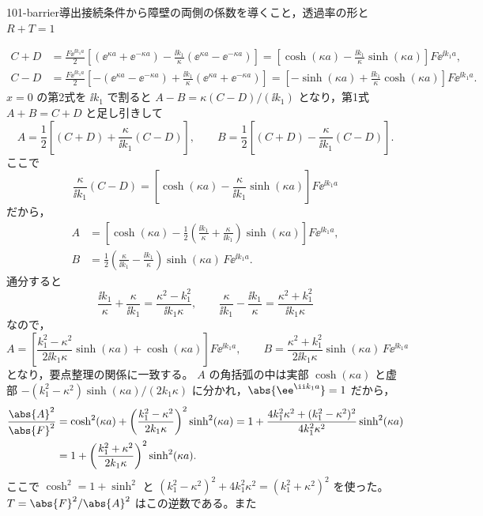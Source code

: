 \documentclass[uplatex,dvipdfmx,a4paper,11pt]{jsarticle}
\begin{document}
\begin{mondai}{101-barrier}{導出}{接続条件から障壁の両側の係数を導くこと，透過率の形と $R+T=1$}
\begin{tadashii}
\begin{align*}
  C+D&=\frac{F\ee^{\ii k_{1}a}}{2}\left[(\ee^{\kappa a}+\ee^{-\kappa a})-\frac{\ii k_{1}}{\kappa}(\ee^{\kappa a}-\ee^{-\kappa a})\right]
     =\left[\cosh(\kappa a)-\frac{\ii k_{1}}{\kappa}\sinh(\kappa a)\right]F\ee^{\ii k_{1}a},\\
  C-D&=\frac{F\ee^{\ii k_{1}a}}{2}\left[-(\ee^{\kappa a}-\ee^{-\kappa a})+\frac{\ii k_{1}}{\kappa}(\ee^{\kappa a}+\ee^{-\kappa a})\right]
     =\left[-\sinh(\kappa a)+\frac{\ii k_{1}}{\kappa}\cosh(\kappa a)\right]F\ee^{\ii k_{1}a} .
\end{align*}
$x=0$ の第2式を $\ii k_{1}$ で割ると $A-B=\kappa(C-D)/(\ii k_{1})$ となり，第1式 $A+B=C+D$ と足し引きして
\[ A=\frac{1}{2}\left[(C+D)+\frac{\kappa}{\ii k_{1}}(C-D)\right],\qquad B=\frac{1}{2}\left[(C+D)-\frac{\kappa}{\ii k_{1}}(C-D)\right] . \]
ここで
\[ \frac{\kappa}{\ii k_{1}}(C-D)=\left[\cosh(\kappa a)-\frac{\kappa}{\ii k_{1}}\sinh(\kappa a)\right]F\ee^{\ii k_{1}a} \]
だから，
\begin{align*}
  A&=\left[\cosh(\kappa a)-\frac{1}{2}\left(\frac{\ii k_{1}}{\kappa}+\frac{\kappa}{\ii k_{1}}\right)\sinh(\kappa a)\right]F\ee^{\ii k_{1}a},\\
  B&=\frac{1}{2}\left(\frac{\kappa}{\ii k_{1}}-\frac{\ii k_{1}}{\kappa}\right)\sinh(\kappa a)\,F\ee^{\ii k_{1}a} .
\end{align*}
通分すると
\[ \frac{\ii k_{1}}{\kappa}+\frac{\kappa}{\ii k_{1}}=\frac{\kappa^{2}-k_{1}^{2}}{\ii k_{1}\kappa},\qquad \frac{\kappa}{\ii k_{1}}-\frac{\ii k_{1}}{\kappa}=\frac{\kappa^{2}+k_{1}^{2}}{\ii k_{1}\kappa} \]
なので，
\[ A=\left[\frac{k_{1}^{2}-\kappa^{2}}{2\ii k_{1}\kappa}\sinh(\kappa a)+\cosh(\kappa a)\right]F\ee^{\ii k_{1}a},\qquad B=\frac{\kappa^{2}+k_{1}^{2}}{2\ii k_{1}\kappa}\sinh(\kappa a)\,F\ee^{\ii k_{1}a} \]
となり，要点整理の関係に一致する。
 $A$ の角括弧の中は実部 $\cosh(\kappa a)$ と虚部 $-(k_{1}^{2}-\kappa^{2})\sinh(\kappa a)/(2k_{1}\kappa)$ に分かれ，$\abs{\ee^{\ii k_{1}a}}=1$ だから，
\begin{align*}
  \frac{\abs{A}^{2}}{\abs{F}^{2}}
  &=\cosh^{2}(\kappa a)+\left(\frac{k_{1}^{2}-\kappa^{2}}{2k_{1}\kappa}\right)^{2}\sinh^{2}(\kappa a)
   =1+\frac{4k_{1}^{2}\kappa^{2}+(k_{1}^{2}-\kappa^{2})^{2}}{4k_{1}^{2}\kappa^{2}}\sinh^{2}(\kappa a)\\
  &=1+\left(\frac{k_{1}^{2}+\kappa^{2}}{2k_{1}\kappa}\right)^{2}\sinh^{2}(\kappa a) .
\end{align*}
ここで $\cosh^{2}=1+\sinh^{2}$ と $(k_{1}^{2}-\kappa^{2})^{2}+4k_{1}^{2}\kappa^{2}=(k_{1}^{2}+\kappa^{2})^{2}$ を使った。$T=\abs{F}^{2}/\abs{A}^{2}$ はこの逆数である。また

\end{tadashii}
\end{mondai}
\end{document}
